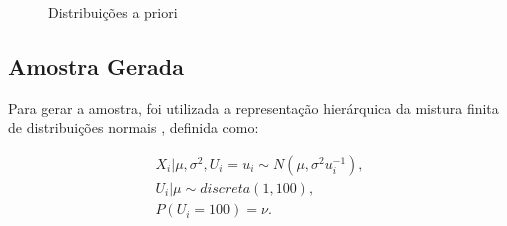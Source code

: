 \documentclass[12pt,reqno,a4paper,oneside, titlepage]{article}
\begin{document}
\begin{figure}[!htb]
	\centering
	\caption{Distribuições a priori}
	\label{fig:priori}
\end{figure}

\subsection{Amostra Gerada}\label{amostra}

Para gerar a amostra, foi utilizada a representação hierárquica da mistura finita de distribuições normais \citep{Chen2017}, definida como:

\begin{equation}\label{eq:hierquica}
\begin{split}
X_i|\mu,\sigma^2,U_{i}=u_i\sim{N}(\mu,\sigma^2u_i^{-1}),\\
U_i|\mu\sim{discreta}(1,100),\\ 
P(U_i=100)=\nu.\\
\end{split}
\end{equation}
\end{document}
